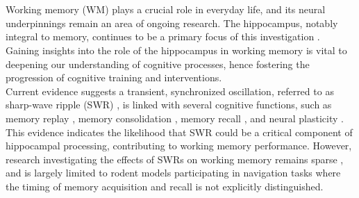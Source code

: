 \documentclass[final,3p,times,twocolumn]{elsarticle}
\providecommand{\DIFaddtex}[1]{{\protect\color{blue}\uwave{#1}}} %
\providecommand{\DIFaddbegin}{} %
\providecommand{\DIFaddend}{} %
\providecommand{\DIFadd}[1]{\texorpdfstring{\DIFaddtex{#1}}{#1}} %
\newcommand{\DIFaddincludegraphics}[2][]{{\color{blue}\fbox{\DIFOincludegraphics[#1]{#2}}}} %
\DeclareRobustCommand{\DIFaddbegin}{\DIFOaddbegin \let\includegraphics\DIFaddincludegraphics} %
\DeclareRobustCommand{\DIFaddend}{\DIFOaddend \let\includegraphics\DIFOincludegraphics} %
\begin{document}

\DIFaddbegin \section{\DIFadd{Introduction}}
\DIFaddend Working memory (WM) plays a crucial role in everyday life, and its neural underpinnings remain an area of ongoing research. The hippocampus, notably integral to memory, continues to be a primary focus of this investigation \cite{scoville_loss_1957} \cite{squire_legacy_2009}  \cite{boran_persistent_2019} \cite{kaminski_persistently_2017} \cite{kornblith_persistent_2017} \cite{faraut_dataset_2018} \cite{borders_hippocampus_2022} \cite{li_functional_2023} \cite{dimakopoulos_information_2022}. Gaining insights into the role of the hippocampus in working memory is vital to deepening our understanding of cognitive processes, hence fostering the progression of cognitive training and interventions.
\\
\indent
Current evidence suggests a transient, synchronized oscillation, referred to as sharp-wave ripple (SWR) \cite{buzsaki_hippocampal_2015}, is linked with several cognitive functions, such as memory replay \cite{wilson_reactivation_1994} \cite{nadasdy_replay_1999} \cite{lee_memory_2002} \cite{diba_forward_2007} \cite{davidson_hippocampal_2009}, memory consolidation \cite{girardeau_selective_2009} \cite{ego-stengel_disruption_2010} \cite{fernandez-ruiz_long-duration_2019} \cite{kim_corticalhippocampal_2022}, memory recall \cite{wu_hippocampal_2017} \cite{norman_hippocampal_2019} \cite{norman_hippocampal_2021}, and neural plasticity \cite{behrens_induction_2005} \cite{norimoto_hippocampal_2018}. This evidence indicates the likelihood that SWR could be a critical component of hippocampal processing, contributing to working memory performance. However, research investigating the effects of SWRs on working memory remains sparse \cite{jadhav_awake_2012}, and is largely limited to rodent models participating in navigation tasks where the timing of memory acquisition and recall is not explicitly distinguished.
\\
\indent
\end{document}
